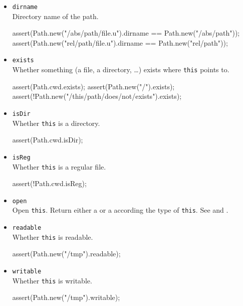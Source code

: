 \begin{itemize}
\item \lstinline|dirname|\\
  Directory name of the path.
\begin{urbiscript}[firstnumber=last]
assert(Path.new("/abs/path/file.u").dirname == Path.new("/abs/path"));
assert(Path.new("rel/path/file.u").dirname  == Path.new("rel/path"));
\end{urbiscript}

\item \lstinline|exists|\\
  Whether something (a file, a directory, \ldots) exists where
  \lstinline|this| points to.
\begin{urbiscript}[firstnumber=last]
assert(Path.cwd.exists);
assert(Path.new("/").exists);
assert(!Path.new("/this/path/does/not/exists").exists);
\end{urbiscript}

\item \lstinline|isDir|\\
  Whether \lstinline|this| is a directory.
\begin{urbiscript}[firstnumber=last]
assert(Path.cwd.isDir);
\end{urbiscript}

\item \lstinline|isReg|\\
  Whether \lstinline|this| is a regular file.
\begin{urbiscript}[firstnumber=last]
assert(!Path.cwd.isReg);
\end{urbiscript}

\item \lstinline|open|\\
  Open \lstinline|this|. Return either a  or a
   according the type of \lstinline|this|. See
   and .

\item \lstinline|readable|\\
  Whether \lstinline|this| is readable.
\begin{urbiscript}[firstnumber=last]
assert(Path.new("/tmp").readable);
\end{urbiscript}

\item \lstinline|writable|\\
  Whether \lstinline|this| is writable.
\begin{urbiscript}[firstnumber=last]
assert(Path.new("/tmp").writable);
\end{urbiscript}


\end{itemize}
